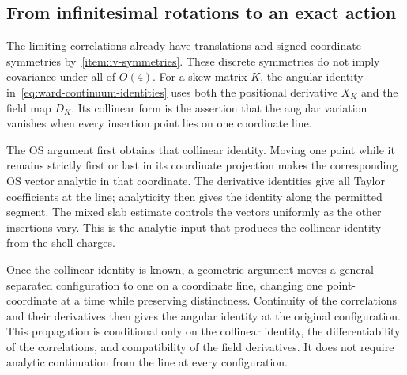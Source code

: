 \subsection{From infinitesimal rotations to an exact action}
\label{subsec:ward-rotations}

The limiting correlations already have translations and signed coordinate symmetries by~\ref{item:iv-symmetries}. These discrete symmetries do not imply covariance under all of $O(4)$. For a skew matrix $K$, the angular identity in~\eqref{eq:ward-continuum-identities} uses both the positional derivative $X_K$ and the field map $D_K$. Its collinear form is the assertion that the angular variation vanishes when every insertion point lies on one coordinate line.

The OS argument first obtains that collinear identity. Moving one point while it remains strictly first or last in its coordinate projection makes the corresponding OS vector analytic in that coordinate. The derivative identities give all Taylor coefficients at the line; analyticity then gives the identity along the permitted segment. The mixed slab estimate controls the vectors uniformly as the other insertions vary. This is the analytic input that produces the collinear identity from the shell charges.


Once the collinear identity is known, a geometric argument moves a general separated configuration to one on a coordinate line, changing one point-coordinate at a time while preserving distinctness. Continuity of the correlations and their derivatives then gives the angular identity at the original configuration. This propagation is conditional only on the collinear identity, the differentiability of the correlations, and compatibility of the field derivatives. It does not require analytic continuation from the line at every configuration.

